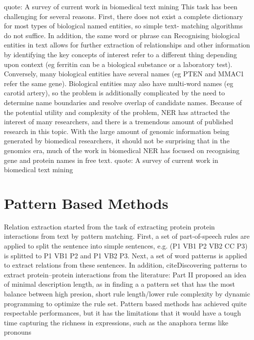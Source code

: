 quote: A survey of current work in biomedical text mining
This task has been challenging for several reasons. First, there does not exist a complete dictionary for most types of biological named entities, so simple text- matching algorithms do not suffice. In addition, the same word or phrase can
Recognising biological entities in text allows for further extraction of relationships and other information by identifying the key concepts of interest
refer to a different thing depending upon context (eg ferritin can be a biological substance or a laboratory test). Conversely, many biological entities have several names (eg PTEN and MMAC1 refer the same gene). Biological entities may also have multi-word names (eg carotid artery), so the problem is additionally complicated by the need to determine name boundaries and resolve overlap of candidate names.
Because of the potential utility and complexity of the problem, NER has attracted the interest of many researchers, and there is a tremendous amount of published research in this topic. With the large amount of genomic information being generated by biomedical researchers, it should not be surprising that in the genomics era, much of the work in biomedical NER has focused on recognising gene and protein names in free text.
quote: A survey of current work in biomedical text mining
\section{Pattern Based Methods}
Relation extraction started from the task of extracting protein protein interactions from text by pattern matching. 
First, a set of part-of-speech rules are applied to split the sentence into simple sentences, e.g. (P1 VB1 P2 VB2 CC P3) is splitted to P1 VB1 P2 and P1 VB2 P3. Next, a set of word patterns is applied to extract relations from these sentences. In addition, cite{Discovering patterns to extract protein–protein interactions
from the literature: Part II} proposed an idea of minimal description length, as in finding a a pattern set that has the most balance between high presion, short rule length/lower rule complexity by dynamic programming to optimize the rule set.  Pattern based methods has achieved quite respectable performances, but it has the limitations that it would have a tough time capturing the richness in expressions, such as the anaphora terms like pronouns 
